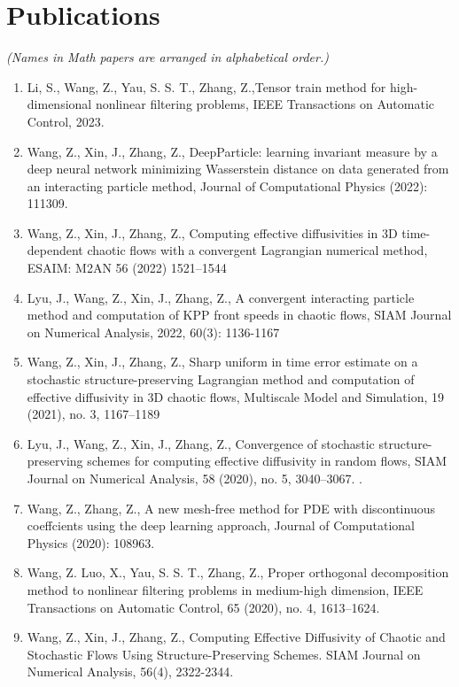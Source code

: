 \documentclass[a4paper,20pt]{article}
\newcounter{pubcounter}
\begin{document}
	\section{Publications}
	\textsl{(Names in Math papers are arranged in alphabetical order.)}
	\begin{enumerate}
		\item{ Li, S., Wang, Z., Yau, S. S. T., Zhang, Z.,Tensor train method for high-dimensional nonlinear filtering problems, IEEE Transactions on Automatic Control, 2023.}
		\item{Wang, Z., Xin, J., Zhang, Z., DeepParticle: learning invariant measure by a deep neural network minimizing Wasserstein distance on data generated from an interacting particle method, Journal of Computational Physics (2022): 111309.}
		\item{Wang, Z., Xin, J., Zhang, Z., Computing effective diffusivities in 3D time-dependent chaotic flows with a convergent Lagrangian numerical method, ESAIM: M2AN 56 (2022) 1521–1544}
		\item{ Lyu, J., Wang, Z., Xin, J., Zhang, Z., A convergent interacting particle method and computation of KPP front speeds in chaotic flows, SIAM Journal on Numerical Analysis, 2022, 60(3): 1136-1167}
		\item{Wang, Z., Xin, J., Zhang, Z., Sharp uniform in time error estimate on a stochastic structure-preserving Lagrangian method and computation of effective diffusivity in 3D chaotic flows, Multiscale Model and Simulation, 19 (2021), no. 3, 1167–1189}
		\item{ Lyu, J., Wang, Z., Xin, J., Zhang, Z., Convergence of stochastic structure-preserving schemes for computing effective diffusivity in random flows, SIAM Journal on Numerical Analysis, 58 (2020), no. 5, 3040–3067. .}
		\item{Wang, Z., Zhang, Z., A new mesh-free method for PDE with discontinuous coeffcients using the deep learning approach,  Journal of Computational Physics (2020): 108963.}
		\item{Wang, Z. Luo, X., Yau, S. S. T., Zhang, Z., Proper orthogonal decomposition method to nonlinear filtering problems in medium-high dimension, IEEE Transactions on Automatic Control, 65 (2020), no. 4, 1613–1624.}
		\item{Wang, Z., Xin, J., Zhang, Z.,  Computing Effective Diffusivity of Chaotic and Stochastic Flows Using Structure-Preserving Schemes. SIAM Journal on Numerical Analysis, 56(4), 2322-2344.}
		\setcounter{pubcounter}{\value{enumi}}
	\end{enumerate}
\end{document}
